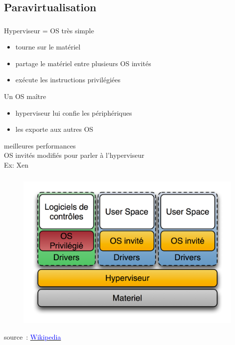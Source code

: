 \subsection{Paravirtualisation}
\begin{frame}
\frametitle{\insertsubsection}
Hyperviseur = OS très simple
\begin{itemize}
\item tourne sur le matériel 
\item partage le matériel entre plusieurs OS invités
\item exécute les instructions privilégiées 
\end{itemize}
\vspace{0.2cm}
Un OS maître
\begin{itemize}
\item hyperviseur lui confie les périphériques 
\item les exporte aux autres OS
\end{itemize}
\vspace{0.5cm}
 meilleures performances\\
 OS invités modifiés pour parler à l'hyperviseur\\
\vspace{0.2cm} Ex: Xen
\end{frame}

\begin{frame}
\frametitle{\insertsubsection}
\vspace{-0.5cm}
\begin{figure}
  \includegraphics[width=0.9\linewidth]{fig4/Diagramme_ArchiHyperviseur.png}
\end{figure}
\vspace{-0.5cm}
\small{source~: \href{http://fr.wikipedia.org/wiki/Fichier:Diagramme_ArchiHyperviseur.png}{\textcolor{blue}{Wikipedia}}}
\end{frame}



